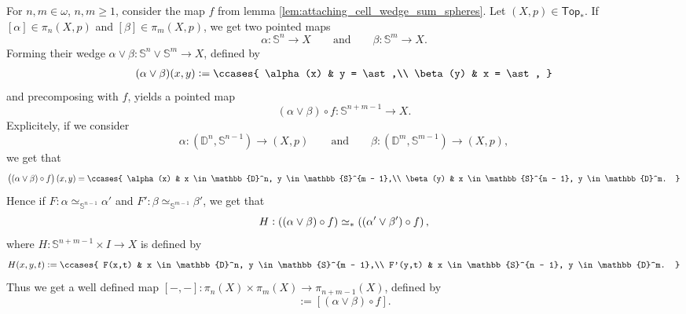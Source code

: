 For $n,m \in \omega$, $n,m \geq 1$, consider the map $f$ from lemma \ref{lem:attaching_cell_wedge_sum_spheres}. Let $(X,p) \in \mathsf{Top}_*$. If $[\alpha] \in \pi_n(X,p)$ and $[\beta] \in \pi_m(X,p)$, we get two pointed maps
\begin{equation*}
	\alpha : \mathbb{S}^n \to X \qquad \text{and} \qquad \beta : \mathbb{S}^m \to X.
\end{equation*}
Forming their wedge $\alpha \vee \beta : \mathbb{S}^n \vee \mathbb{S}^m \to X$, defined by
\begin{align*}
	(\alpha \vee \beta) (x,y) := \ccases{
		\alpha(x) & y = \ast,\\
		\beta(y) & x = \ast,
	}
\end{align*}
\noindent and precomposing with $f$, yields a pointed map
\begin{equation*}
	(\alpha \vee \beta) \circ f : \mathbb{S}^{n + m - 1} \to X.
\end{equation*}
Explicitely, if we consider
\begin{equation*}
	\alpha : (\mathbb{D}^n,\mathbb{S}^{n - 1}) \to (X,p) \qquad \text{and} \qquad \beta : (\mathbb{D}^m,\mathbb{S}^{m - 1}) \to (X,p),
\end{equation*}
\noindent we get that
\begin{align}
	\label{eq:Whitehead_product}
	\del[1]{(\alpha \vee \beta) \circ f}(x,y) = \ccases{
		\alpha(x) & x \in \mathbb{D}^n, y \in \mathbb{S}^{m - 1},\\
		\beta(y) & x \in \mathbb{S}^{n - 1}, y \in \mathbb{D}^m.
	}
\end{align}
Hence if $F : \alpha \simeq_{\mathbb{S}^{n - 1}} \alpha'$ and $F' : \beta \simeq_{\mathbb{S}^{m - 1}} \beta'$, we get that 
\begin{equation*}
	H : \del[0]{(\alpha \vee \beta) \circ f} \simeq_\ast \del[0]{(\alpha' \vee \beta') \circ f},
\end{equation*}
\noindent where $H : \mathbb{S}^{n + m - 1} \times I \to X$ is defined by
\begin{align*}
	H(x,y,t) := \ccases{
		F(x,t) & x \in \mathbb{D}^n, y \in \mathbb{S}^{m - 1},\\
		F'(y,t) & x \in \mathbb{S}^{n - 1}, y \in \mathbb{D}^m.
	}
\end{align*}
Thus we get a well defined map $[-,-] : \pi_n(X) \times \pi_m(X) \to \pi_{n + m - 1}(X)$, defined by
\begin{equation*}
	[\alpha,\beta] := [(\alpha \vee \beta) \circ f].
\end{equation*}

